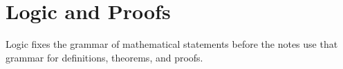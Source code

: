 \section{Logic and Proofs}

Logic fixes the grammar of mathematical statements before the notes use that grammar for definitions, theorems, and proofs.












